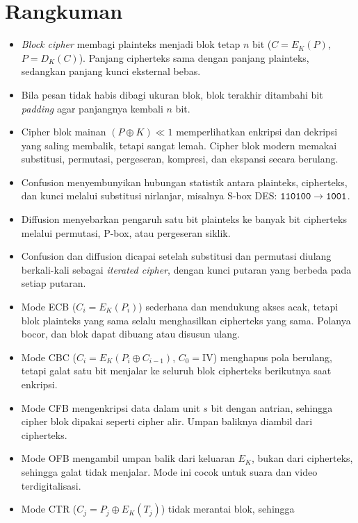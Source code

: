\section{Rangkuman}
\begin{itemize}
    \item \textit{Block cipher} membagi plainteks menjadi blok tetap $n$ bit
          ($C=E_K(P)$, $P=D_K(C)$). Panjang cipherteks sama dengan panjang
          plainteks, sedangkan panjang kunci eksternal bebas.
    \item Bila pesan tidak habis dibagi ukuran blok, blok terakhir ditambahi bit
          \textit{padding} agar panjangnya kembali $n$ bit.
    \item Cipher blok mainan $(P\oplus K)\ll 1$ memperlihatkan enkripsi dan
          dekripsi yang saling membalik, tetapi sangat lemah. Cipher blok modern
          memakai substitusi, permutasi, pergeseran, kompresi, dan ekspansi
          secara berulang.
    \item Confusion menyembunyikan hubungan statistik antara plainteks,
          cipherteks, dan kunci melalui substitusi nirlanjar, misalnya S-box
          DES: $\texttt{110100}\to\texttt{1001}$.
    \item Diffusion menyebarkan pengaruh satu bit plainteks ke banyak bit
          cipherteks melalui permutasi, P-box, atau pergeseran siklik.
    \item Confusion dan diffusion dicapai setelah substitusi dan permutasi
          diulang berkali-kali sebagai \textit{iterated cipher}, dengan kunci
          putaran yang berbeda pada setiap putaran.
    \item Mode ECB ($C_i=E_K(P_i)$) sederhana dan mendukung akses acak, tetapi
          blok plainteks yang sama selalu menghasilkan cipherteks yang sama.
          Polanya bocor, dan blok dapat dibuang atau disusun ulang.
    \item Mode CBC ($C_i=E_K(P_i\oplus C_{i-1})$, $C_0=\mathrm{IV}$) menghapus
          pola berulang, tetapi galat satu bit menjalar ke seluruh blok
          cipherteks berikutnya saat enkripsi.
    \item Mode CFB mengenkripsi data dalam unit $s$ bit dengan antrian, sehingga
          cipher blok dipakai seperti cipher alir. Umpan baliknya diambil dari
          cipherteks.
    \item Mode OFB mengambil umpan balik dari keluaran $E_K$, bukan dari
          cipherteks, sehingga galat tidak menjalar. Mode ini cocok untuk suara
          dan video terdigitalisasi.
    \item Mode CTR ($C_j=P_j\oplus E_K(T_j)$) tidak merantai blok, sehingga

\end{itemize}
